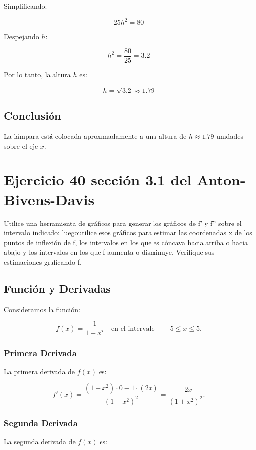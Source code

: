 \documentclass[11pt,letterpaper]{article}
\begin{document}
Simplificando:

\[
25h^2 = 80
\]

Despejando \(h\):

\[
h^2 = \frac{80}{25} = 3.2
\]

Por lo tanto, la altura \(h\) es:

\[
h = \sqrt{3.2} \approx 1.79
\]

\subsection*{Conclusión}

La lámpara está colocada aproximadamente a una altura de \(h \approx 1.79\) unidades sobre el eje \(x\).

\section*{Ejercicio 40 sección 3.1 del Anton-Bivens-Davis}

Utilice una herramienta de gráficos para generar los gráficos de f' y f'' sobre el intervalo indicado: luegoutilice esos gráficos para estimar las coordenadas x de los puntos de inflexión de f, los intervalos en los que es cóncava hacia arriba o hacia abajo y los intervalos en los que f aumenta o disminuye. Verifique sus estimaciones graficando f.

\subsection*{Función y Derivadas}

Consideramos la función:

\[
f(x) = \frac{1}{1+x^2} \quad \text{en el intervalo} \quad -5 \leq x \leq 5.
\]

\subsubsection*{Primera Derivada}

La primera derivada de \( f(x) \) es:

\[
f'(x) = \frac{(1+x^2) \cdot 0 - 1 \cdot (2x)}{(1+x^2)^2} = \frac{-2x}{(1+x^2)^2}.
\]

\subsubsection*{Segunda Derivada}

La segunda derivada de \( f(x) \) es:
\end{document}
